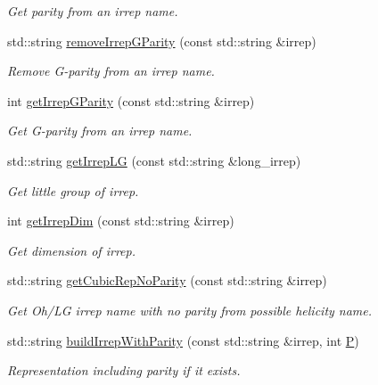 \begin{DoxyCompactItemize}
\begin{DoxyCompactList}\small\item\em Get parity from an irrep name. \end{DoxyCompactList}\item 
std\+::string \mbox{\hyperlink{namespaceHadron_a6c2109897dff664c15b3fe81aa7d8917}{remove\+Irrep\+G\+Parity}} (const std\+::string \&irrep)
\begin{DoxyCompactList}\small\item\em Remove G-\/parity from an irrep name. \end{DoxyCompactList}\item 
int \mbox{\hyperlink{namespaceHadron_a951cfb9d3a3b24aaf558d2e22513cec1}{get\+Irrep\+G\+Parity}} (const std\+::string \&irrep)
\begin{DoxyCompactList}\small\item\em Get G-\/parity from an irrep name. \end{DoxyCompactList}\item 
std\+::string \mbox{\hyperlink{namespaceHadron_a79373fb0ae210931217ae33dc98f5ee9}{get\+Irrep\+LG}} (const std\+::string \&long\+\_\+irrep)
\begin{DoxyCompactList}\small\item\em Get little group of irrep. \end{DoxyCompactList}\item 
int \mbox{\hyperlink{namespaceHadron_a0451202d2f27c90c438c0d23da609c62}{get\+Irrep\+Dim}} (const std\+::string \&irrep)
\begin{DoxyCompactList}\small\item\em Get dimension of irrep. \end{DoxyCompactList}\item 
std\+::string \mbox{\hyperlink{namespaceHadron_a6efae379facc253e72b35cf4d235dc88}{get\+Cubic\+Rep\+No\+Parity}} (const std\+::string \&irrep)
\begin{DoxyCompactList}\small\item\em Get Oh/\+LG irrep name with no parity from possible helicity name. \end{DoxyCompactList}\item 
std\+::string \mbox{\hyperlink{namespaceHadron_a036614bb88af01a4308fe463a99f5b12}{build\+Irrep\+With\+Parity}} (const std\+::string \&irrep, int \mbox{\hyperlink{operator__name__util_8cc_aef94be98e2c9e4a4dece75f60ca9792c}{P}})
\begin{DoxyCompactList}\small\item\em Representation including parity if it exists. \end{DoxyCompactList}\item 

\end{DoxyCompactItemize}
